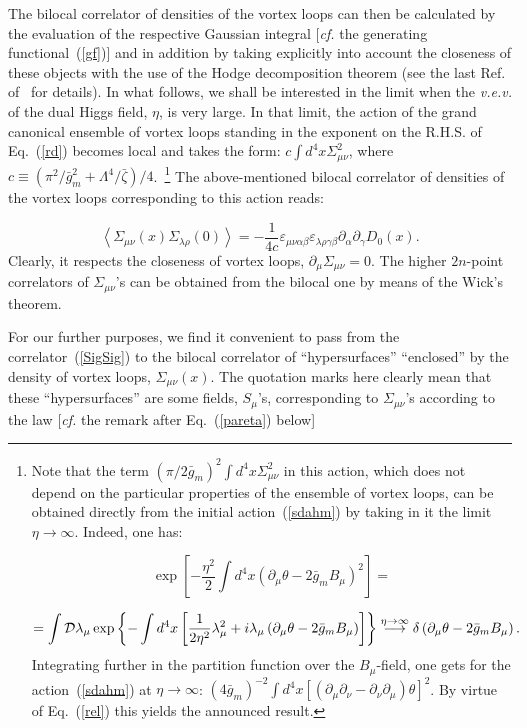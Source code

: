 \documentclass[a4paper,12pt]{article}
\begin{document}
The bilocal correlator of densities of the vortex loops can then be calculated by the evaluation of the 
respective Gaussian integral [{\it cf.} the generating functional~(\ref{gf})] and in addition by 
taking explicitly into account the closeness of these objects with the use of 
the Hodge decomposition theorem (see the last Ref. of~\cite{ijmpa} for details). In what follows,
we shall be interested in the limit when the {\it v.e.v.} of the dual Higgs field, $\eta$,
is very large. In that limit, the action of the grand canonical ensemble of vortex loops
standing in the exponent on the R.H.S. of Eq.~(\ref{rd}) becomes local and takes the form:
$c\int d^4x\Sigma_{\mu\nu}^2$, where $c\equiv\left(\pi^2/\bar g_m^2+\Lambda^4/\bar\zeta\right)/4$.~\footnote{Note that 
the term $(\pi/2\bar g_m)^2\int d^4x\Sigma_{\mu\nu}^2$ in this action, which does not depend on the particular properties
of the ensemble of vortex loops, can be obtained directly from the initial action~(\ref{sdahm}) by taking
in it the limit $\eta\to\infty$. Indeed, one has:

$$
\exp\left[-\frac{\eta^2}{2}\int d^4x\left(\partial_\mu\theta-2\bar g_mB_\mu\right)^2\right]=$$

$$
=\int {\cal D}\lambda_\mu\exp\left\{-\int d^4x\left[\frac{1}{2\eta^2}\lambda_\mu^2+i\lambda_\mu
\left(\partial_\mu\theta-2\bar g_mB_\mu\right)\right]\right\}
\stackrel{\eta\to\infty}{\longrightarrow}\delta\left(\partial_\mu\theta-2\bar g_mB_\mu\right).$$
Integrating further in the partition function over the $B_\mu$-field, one gets for the action~(\ref{sdahm}) 
at $\eta\to\infty$: $(4\bar g_m)^{-2}
\int d^4x\left[(\partial_\mu\partial_\nu-\partial_\nu\partial_\mu)\theta\right]^2$.  
By virtue of Eq.~(\ref{rel}) this yields the announced result.}
The above-mentioned bilocal correlator of densities of the vortex loops corresponding to this action reads:

\begin{equation}
\label{SigSig}
\left<\Sigma_{\mu\nu}(x)\Sigma_{\lambda\rho}(0)\right>=-\frac{1}{4c}\varepsilon_{\mu\nu\alpha\beta}
\varepsilon_{\lambda\rho\gamma\beta}\partial_\alpha\partial_\gamma D_0(x).
\end{equation}
Clearly, it respects the closeness of vortex loops, $\partial_\mu\Sigma_{\mu\nu}=0$. 
The higher $2n$-point correlators
of $\Sigma_{\mu\nu}$'s can be obtained from the bilocal one by means of the Wick's theorem. 

For our further purposes, we find it convenient to pass from the correlator~(\ref{SigSig}) to the 
bilocal correlator of ``hypersurfaces'' ``enclosed'' by the density of vortex loops, $\Sigma_{\mu\nu}(x)$.
The quotation marks here clearly mean that these ``hypersurfaces'' are some fields, $S_\mu$'s, corresponding
to $\Sigma_{\mu\nu}$'s according to the law [{\it cf.} the remark after Eq.~(\ref{pareta}) below]
\end{document}
